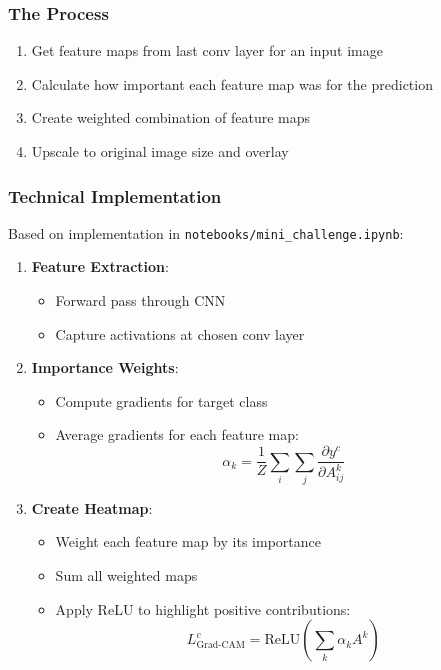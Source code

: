 \documentclass{article}
\begin{document}
\subsubsection{The Process}
\begin{enumerate}
    \item Get feature maps from last conv layer for an input image
    \item Calculate how important each feature map was for the prediction
    \item Create weighted combination of feature maps
    \item Upscale to original image size and overlay
\end{enumerate}

\subsubsection{Technical Implementation}
Based on implementation in \texttt{notebooks/mini\_challenge.ipynb}:

\begin{enumerate}
    \item \textbf{Feature Extraction}:
        \begin{itemize}
            \item Forward pass through CNN
            \item Capture activations at chosen conv layer
        \end{itemize}
    
    \item \textbf{Importance Weights}:
        \begin{itemize}
            \item Compute gradients for target class
            \item Average gradients for each feature map:
            \begin{equation}
                \alpha_k = \frac{1}{Z} \sum_i \sum_j \frac{\partial y^c}{\partial A^k_{ij}}
            \end{equation}
        \end{itemize}
    
    \item \textbf{Create Heatmap}:
        \begin{itemize}
            \item Weight each feature map by its importance
            \item Sum all weighted maps
            \item Apply ReLU to highlight positive contributions:
            \begin{equation}
                L^c_\text{Grad-CAM} = \text{ReLU}\left(\sum_k \alpha_k A^k\right)
            \end{equation}
        \end{itemize}
\end{enumerate}
\end{document}
